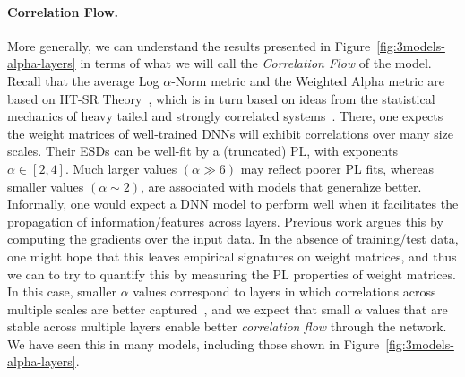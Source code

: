 \vspace{-1mm}
\paragraph{Correlation Flow.}

More generally, we can understand the results presented in Figure~\ref{fig:3models-alpha-layers} in terms of what we will call the \emph{Correlation Flow} of the model. 
Recall that the average Log $\alpha$-Norm metric and the Weighted Alpha metric are based on HT-SR Theory~\cite{MM18_TR, MM19_HTSR_ICML, MM20_SDM}, which is in turn based on ideas from the statistical mechanics of heavy tailed and strongly correlated systems~\cite{BouchaudPotters03, SornetteBook, BP11, bun2017}. 
There, one expects the weight matrices of well-trained DNNs will exhibit correlations over many size scales. 
Their ESDs can be well-fit by a (truncated) PL, with exponents $\alpha\in[2,4]$.
Much larger values $(\alpha\gg 6)$ may reflect poorer PL fits, whereas smaller values $(\alpha\sim 2)$, are associated with models that generalize better.
Informally, one would expect a DNN model to perform well when it facilitates the propagation of information/features across layers.
Previous work argues this by computing the gradients over the input data.
In the absence of training/test data, one might hope that this leaves empirical signatures on weight matrices, and thus we can to try to quantify this by measuring the PL properties of weight matrices.
In this case, smaller $\alpha$ values correspond to layers in which correlations across multiple scales are better captured~\cite{MM18_TR,SornetteBook}, and we expect that small $\alpha$ values that are stable across multiple layers enable better \emph{correlation flow} through the network.
We have seen this in many models, including those shown in Figure~\ref{fig:3models-alpha-layers}.


